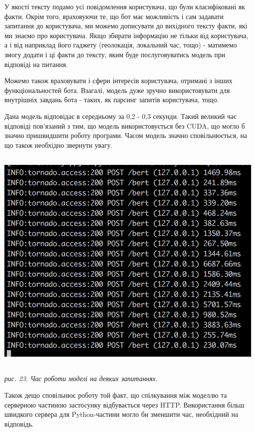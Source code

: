 У якості тексту подамо усі повідомлення користувача, що були класифіковані як факти. Окрім того, враховуючи те, що бот має можливість і сам задавати запитання до користувача, ми можемо дописувати до вихідного тексту факти, які ми знаємо про користувача. Якщо збирати інформацію не тільки від користувача, а і від наприклад його гаджету (геолокація, локальний час, тощо) - матимемо змогу додати і ці факти до тексту, яким буде послуговуватись модель при відповіді на питання.

Можемо також враховувати і сфери інтересів користувача, отримані з інших функціональностей бота. Взагалі, модель дуже зручно використовувати для внутрішніх завдань бота - таких, як парсинг запитів користувача, тощо.

Дана модель відповідає в середньому за 0,2 - 0,3 секунди. Такий великий час відповіді пов'язаний з тим, що модель використовується без CUDA, що могло б значно пришвидшити роботу програми. Часом модель значно сповільнюється, на що також необхідно звернути увагу. 
\includegraphics[height = 12cm]{Dissertation/bert_times.png}\\
\textit{рис. 23. Час роботи моделі на деяких запитаннях. }

Також дещо сповільнює роботу той факт, що спілкування між моделлю та серверною частиною застосунку відбувається через HTTP. Використання більш швидкого сервера для Python-частини могло би зменшити час, необхідний на відповідь.

